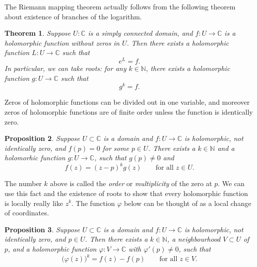 \documentclass[12pt,openany]{book}
\newcommand{\C}{{\mathbb{C}}}
\newcommand{\N}{{\mathbb{N}}}
\theoremstyle{plain}
\newtheorem{thm}{Theorem}[section]
\newtheorem{prop}[thm]{Proposition}
\theoremstyle{remark}
\theoremstyle{definition}
\theoremstyle{exercise}
\theoremstyle{example}
\begin{document}
The Riemann mapping theorem actually follows from the following
theorem about existence of branches of the logarithm.

\begin{thm}
Suppose $U \colon \C$ is a simply connected domain, and $f \colon U \to \C$
is a holomorphic function without zeros in $U$.  Then there exists a
holomorphic function $L \colon U \to \C$ such that
\begin{equation*}
e^L = f .
\end{equation*}
In particular, we can take roots:
for any $k \in \N$, there exists a holomorphic function
$g \colon U \to \C$ such that
\begin{equation*}
g^k = f .
\end{equation*}
\end{thm}

Zeros of holomorphic functions
can be divided out in one variable, and moreover zeros
of holomorphic functions are of finite order unless
the function is identically zero.

\begin{prop}
Suppose $U \subset \C$ is a domain and
$f \colon U \to \C$ is holomorphic, not identically zero, and $f(p) = 0$
for some $p \in U$.  There exists a $k \in \N$ and
a holomorhic function $g \colon U \to \C$,
such that $g(p) \not= 0$ and
\begin{equation*}
f(z) = {(z-p)}^k g(z) \qquad \text{for all $z \in U$.}
\end{equation*}
\end{prop}

The number $k$ above is called the \emph{order}
or \emph{multiplicity}
of the zero at $p$.
We can use this fact and the existence of roots to show that every
holomorphic function is locally really like $z^k$.  The function $\varphi$
below can be thought of as a local change of coordinates.

\begin{prop}
Suppose $U \subset \C$ is a domain and
$f \colon U \to \C$ is holomorphic, not identically zero, and $p \in U$.
Then there exists a $k \in \N$,
a neighbourhood $V \subset U$ of $p$,  and
a holomorphic function $\varphi \colon V \to \C$ with 
$\varphi'(p) \not= 0$, such that
\begin{equation*}
{\bigl(\varphi(z)\bigr)}^k = f(z) - f(p)
\qquad \text{for all $z \in V$.}
\end{equation*}
\end{prop}
\end{document}

